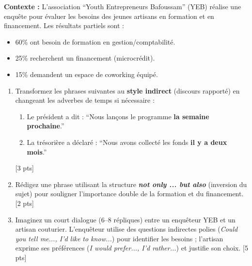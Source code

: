 \documentclass[11pt]{article}
\begin{document}
\begin{exercice}
\textbf{Contexte :} L'association ``Youth Entrepreneurs Bafoussam'' (YEB) réalise une enquête pour évaluer les besoins des jeunes artisans en formation et en financement. Les résultats partiels sont :

\begin{itemize}
    \item 60\% ont besoin de formation en gestion/comptabilité.
    \item 25\% recherchent un financement (microcrédit).
    \item 15\% demandent un espace de coworking équipé.
\end{itemize}

\begin{enumerate}
    \item Transformez les phrases suivantes au \textbf{style indirect} (discours rapporté) en changeant les adverbes de temps si nécessaire :
    \begin{enumerate}
        \item Le président a dit : ``Nous lançons le programme \textbf{la semaine prochaine}.''
        \item La trésorière a déclaré : ``Nous avons collecté les fonds \textbf{il y a deux mois}.''
    \end{enumerate}
    [3 pts]
    \item Rédigez une phrase utilisant la structure \textbf{\textit{not only ... but also}} (inversion du sujet) pour souligner l'importance double de la formation et du financement. [2 pts]
    \item Imaginez un court dialogue (6--8 répliques) entre un enquêteur YEB et un artisan couturier. L'enquêteur utilise des questions indirectes polies (\textit{Could you tell me..., I'd like to know...}) pour identifier les besoins ; l'artisan exprime ses préférences (\textit{I would prefer..., I'd rather...}) et justifie son choix. [5 pts]
\end{enumerate}
\end{exercice}
\end{document}
